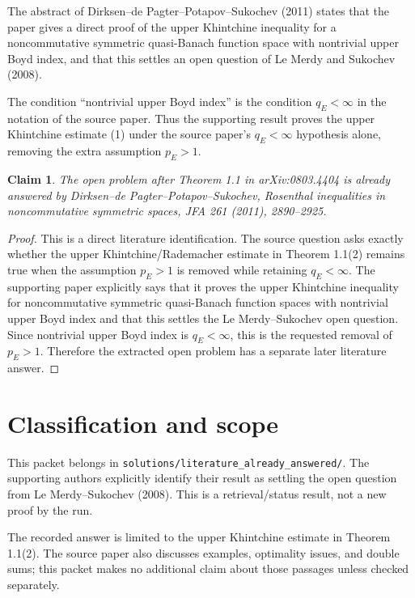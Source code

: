 \documentclass[11pt]{article}
\newtheorem*{claim}{Claim}
\begin{document}
The abstract of Dirksen--de Pagter--Potapov--Sukochev (2011) states that the
paper gives a direct proof of the upper Khintchine inequality for a
noncommutative symmetric quasi-Banach function space with nontrivial upper
Boyd index, and that this settles an open question of Le Merdy and Sukochev
(2008).

The condition ``nontrivial upper Boyd index'' is the condition \(q_E<\infty\)
in the notation of the source paper. Thus the supporting result proves the
upper Khintchine estimate (1) under the source paper's \(q_E<\infty\)
hypothesis alone, removing the extra assumption \(p_E>1\).

\begin{claim}
The open problem after Theorem 1.1 in arXiv:0803.4404 is already answered by
Dirksen--de Pagter--Potapov--Sukochev, \emph{Rosenthal inequalities in
noncommutative symmetric spaces}, JFA 261 (2011), 2890--2925.
\end{claim}

\begin{proof}
This is a direct literature identification. The source question asks exactly
whether the upper Khintchine/Rademacher estimate in Theorem 1.1(2) remains
true when the assumption \(p_E>1\) is removed while retaining \(q_E<\infty\).
The supporting paper explicitly says that it proves the upper Khintchine
inequality for noncommutative symmetric quasi-Banach function spaces with
nontrivial upper Boyd index and that this settles the Le Merdy--Sukochev
open question. Since nontrivial upper Boyd index is \(q_E<\infty\), this is
the requested removal of \(p_E>1\). Therefore the extracted open problem has
a separate later literature answer.
\end{proof}

\section*{Classification and scope}

This packet belongs in
\texttt{solutions/literature\_already\_answered/}. The supporting authors
explicitly identify their result as settling the open question from Le
Merdy--Sukochev (2008). This is a retrieval/status result, not a new proof by
the run.

The recorded answer is limited to the upper Khintchine estimate in Theorem
1.1(2). The source paper also discusses examples, optimality issues, and
double sums; this packet makes no additional claim about those passages unless
checked separately.
\end{document}
